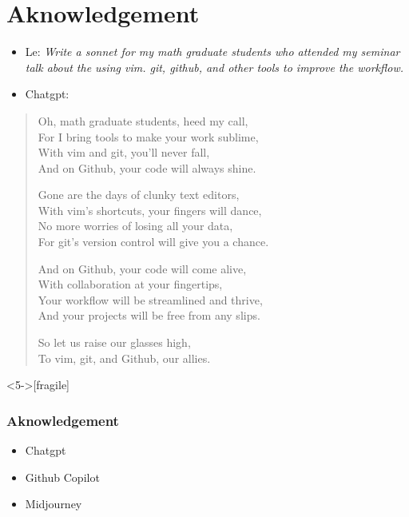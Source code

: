 \documentclass[9pt,table,xcolor=dvipsnames]{beamer}%
\theoremstyle{definition}
\theoremstyle{plain}
\begin{document}
\section{Aknowledgement}
\begin{frame}[fragile,t] %
  \begin{itemize}
    \item Le: {\small \it Write a sonnet for my math graduate students who
      attended my seminar talk about the using vim. git, github, and other
    tools to improve the workflow.}
    \vfill

    \item Chatgpt:
  \end{itemize}
   \begin{quotation}
      Oh, math graduate students, heed my call, \\
      For I bring tools to make your work sublime, \\
      With vim and git, you'll never fall, \\
      And on Github, your code will always shine.       \\ \bigskip

      Gone are the days of clunky text editors,         \\
      With vim's shortcuts, your fingers will dance,    \\
      No more worries of losing all your data,          \\
      For git's version control will give you a chance. \\ \bigskip

      And on Github, your code will come alive,         \\
      With collaboration at your fingertips,            \\
      Your workflow will be streamlined and thrive,     \\
      And your projects will be free from any slips.    \\ \bigskip

      So let us raise our glasses high,                 \\
      To vim, git, and Github, our allies.              \\
   \end{quotation} 
\end{frame}
\begin{frame}<5->[fragile] %
  \frametitle{Aknowledgement}

  \begin{center}
    \begin{minipage}{0.4 \textwidth}
      \Large
      \begin{itemize}
        \item Chatgpt
        \item Github Copilot
        \item Midjourney
      \end{itemize}
    \end{minipage}
  \end{center}


\end{frame}
\end{document}
